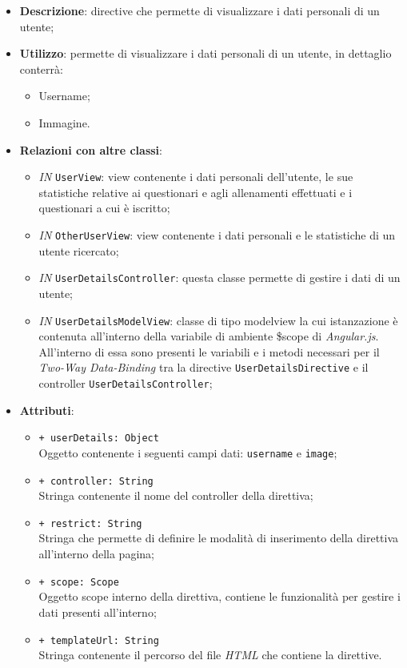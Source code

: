\begin{itemize}
	\item \textbf{Descrizione}: directive che permette di visualizzare i dati personali di un utente;
	\item \textbf{Utilizzo}: permette di visualizzare i dati personali di un utente, in dettaglio conterrà:
	\begin{itemize}
		\item Username;
		\item Immagine.
	\end{itemize}
	\item \textbf{Relazioni con altre classi}:
	\begin{itemize}
		\item \textit{IN} \texttt{UserView}: view contenente i dati personali dell'utente, le sue statistiche relative ai questionari e agli allenamenti effettuati e i questionari a cui è iscritto;
		\item \textit{IN} \texttt{OtherUserView}: view contenente i dati personali e le statistiche di un utente ricercato;
		\item \textit{IN} \texttt{UserDetailsController}: questa classe permette di gestire i dati di un utente;
		\item \textit{IN} \texttt{UserDetailsModelView}: classe di tipo modelview la cui istanzazione è contenuta all'interno della variabile di ambiente \$scope di \textit{Angular.js}. All'interno di essa sono presenti le variabili e i metodi necessari per il \textit{Two-Way Data-Binding} tra la directive \texttt{UserDetailsDirective} e il controller \texttt{UserDetailsController};
	\end{itemize}
	\item \textbf{Attributi}:
	\begin{itemize}
		\item \texttt{+ userDetails: Object} \\ Oggetto contenente i seguenti campi dati: \texttt{username} e \texttt{image};
		\item \texttt{+ controller: String} \\ Stringa contenente il nome del controller della direttiva;
		\item \texttt{+ restrict: String} \\ Stringa che permette di definire le modalità di inserimento della direttiva all'interno della pagina;
		\item \texttt{+ scope: Scope} \\ Oggetto scope interno della direttiva, contiene le funzionalità per gestire i dati presenti all'interno;
		\item \texttt{+ templateUrl: String} \\ Stringa contenente il percorso del file \textit{HTML} che contiene la direttive.
	\end{itemize}
\end{itemize}

